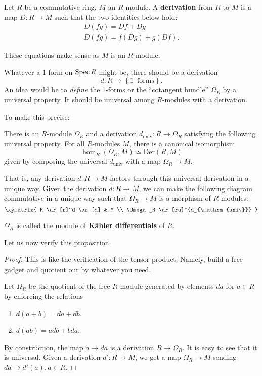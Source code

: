 \begin{definition} 
Let $R$ be a commutative ring, $M$ an $R$-module. A \textbf{derivation} from
$R$ to $M$ is a map $D: R \to M$ such that the two identities below hold:
\begin{gather} D(fg)= Df + Dg  \\
 D(fg) = f(Dg) + g(Df).  \end{gather}
\end{definition} 
These equations make sense as $M$ is an $R$-module.

Whatever a 1-form on $\operatorname{Spec} R$ might be, there should be a derivation
\[ d: R \to \left\{\text{1--forms}\right\}.  \]
An idea would be to \emph{define} the 1-forms or the ``cotangent bundle''
$\Omega_R$ by a
universal property. It should be universal among $R$-modules with a derivation.

To make this precise:
\begin{proposition} 
There is an $R$-module $\Omega_R$ and a derivation $d_{\mathrm{univ}} : R \to
\Omega_R$ satisfying the following universal property. For all $R$-modules
$M$, there is a canonical isomorphism 
\[ \hom_{R}(\Omega_R, M) \simeq \mathrm{Der}(R, M)  \]
given by composing the universal $d_{\mathrm{univ}}$ with a map $\Omega_R \to M$.
\end{proposition} 

That is, any derivation $d: R \to M$ factors through this universal derivation
in a unique way. Given the derivation $d: R \to M$, we can make the following diagram
commutative in a unique way such that $\Omega_R \to M$ is a morphism of
$R$-modules:
\[ 
\xymatrix{
R \ar[r]^d \ar[d]  &  M \\
\Omega_R \ar[ru]^{d_{\mathrm{univ}}}
}
\]

\begin{definition} 
$\Omega_R$ is called the module of \textbf{K\"ahler differentials} of $R$.
\end{definition} 

Let us now verify this proposition.
\begin{proof} 
This is like the verification of the tensor product. Namely, build a free
gadget and quotient out by whatever you need.

Let $\Omega_R$ be the quotient of the free $R$-module generated by elements
$da$ for $a \in R$ by enforcing the relations
\begin{enumerate}
\item $d(a+b) =da + db$. 
\item $d(ab) = adb + bda$.
\end{enumerate}
By construction, the map $a \to da$ is a derivation $R \to \Omega_R$. 
It is easy to see that it is universal. Given a derivation $d': R \to M$, we get a
map $\Omega_R \to M$ sending $da \to d'(a), a \in R$.
\end{proof} 

